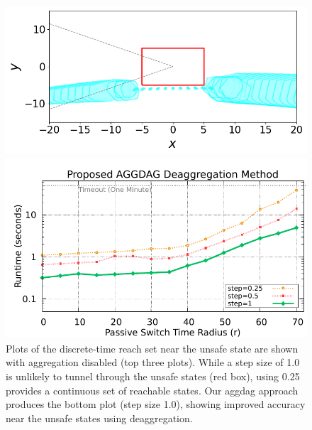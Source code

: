 \begin{figure}
\begin{minipage}{0.48\textwidth}
\begin{minipage}[b]{\linewidth}
\end{minipage}
\\
\vspace{0.5em}
\begin{minipage}[b]{\linewidth}
  \centering
    \includegraphics[width=0.9\columnwidth,trim=0 1.3em 0 0, clip]{images/deagg_1_0.png}
\end{minipage}
\caption{{\footnotesize Plots of the discrete-time reach set near the unsafe state are shown with aggregation disabled (top three plots).
  While a step size of 1.0 is unlikely to tunnel
  through the unsafe states (red box), using 0.25 provides a continuous set of reachable states. Our aggdag approach
  produces the bottom plot (step size 1.0), showing improved accuracy near the unsafe states using deaggregation.}}\label{fig:step_size}
\end{minipage}
\hspace{1em}
\begin{minipage}{0.48\textwidth}
\begin{minipage}[b]{\linewidth}
\centerline{\includegraphics[width=0.95\columnwidth]{images/deagg.pdf}}

\end{minipage}
\end{minipage}
\end{figure}
